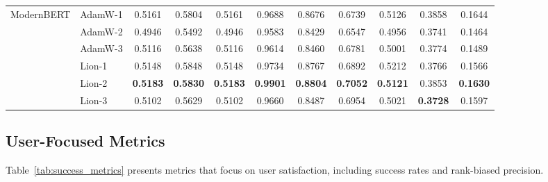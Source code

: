 \documentclass[conference]{IEEEtran}
\begin{document}
\begin{table}[t]
{\begin{tabular}{llccccccccc}
\midrule
\multirow{6}{*}{ModernBERT} & AdamW-1 & 0.5161 & 0.5804 & 0.5161 & 0.9688 & 0.8676 & 0.6739 & 0.5126 & 0.3858 & 0.1644 \\
 & AdamW-2 & 0.4946 & 0.5492 & 0.4946 & 0.9583 & 0.8429 & 0.6547 & 0.4956 & 0.3741 & 0.1464 \\
 & AdamW-3 & 0.5116 & 0.5638 & 0.5116 & 0.9614 & 0.8460 & 0.6781 & 0.5001 & 0.3774 & 0.1489 \\
 & Lion-1 & 0.5148 & 0.5848 & 0.5148 & 0.9734 & 0.8767 & 0.6892 & 0.5212 & 0.3766 & 0.1566 \\
 & Lion-2 & \textbf{0.5183} & \textbf{0.5830} & \textbf{0.5183} & \textbf{0.9901} & \textbf{0.8804} & \textbf{0.7052} & \textbf{0.5121} & 0.3853 & \textbf{0.1630} \\
 & Lion-3 & 0.5102 & 0.5629 & 0.5102 & 0.9660 & 0.8487 & 0.6954 & 0.5021 & \textbf{0.3728} & 0.1597 \\
\bottomrule
\end{tabular}%
}
\end{table}

\subsection{User-Focused Metrics}
Table~\ref{tab:success_metrics} presents metrics that focus on user satisfaction, including success rates and rank-biased precision.
\end{document}
